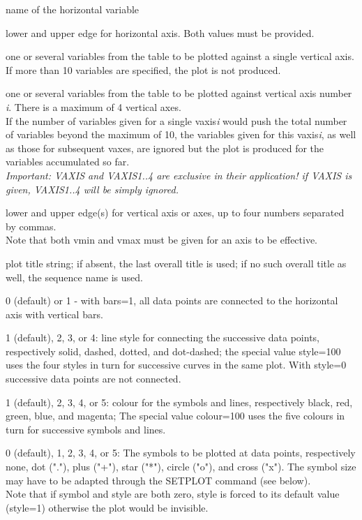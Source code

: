 \begin{madlist}
    name of the horizontal variable 

    lower and upper edge for horizontal axis. Both
   values must be provided. 

    one or several variables from the table to be plotted
     against a single vertical axis. If more than 10 variables are
     specified, the plot is not produced.   

    one or several variables from the table to be plotted
     against vertical axis number {\sl i}. There is a maximum of 4
     vertical axes. \\
     If the number of variables given for a single vaxis{\sl i} would
     push the total number of variables beyond the maximum of 10, the
     variables given for this vaxis{\sl i}, as well as those for
     subsequent vaxes, are ignored but the plot is produced for the
     variables accumulated so far.  \\
     \textit{Important: VAXIS and VAXIS{1..4} are exclusive in their
       application! if VAXIS is given, VAXIS{1..4} will be simply ignored.} 

    lower and upper edge(s) for vertical axis or axes, up to four
     numbers separated by commas.\\
     Note that both vmin and vmax must be given for an axis to be effective.   

    plot title string; if absent, the last overall title is
     used; if no such overall title as well, the sequence name is used.

    0 (default) or 1 - with bars=1, all data points
     are connected to the horizontal axis with vertical bars.   

    1 (default), 2, 3, or 4: line style for connecting the
     successive data points, respectively solid, dashed, dotted, and dot-dashed; 
     the special value style=100 uses the four styles in turn for
     successive curves in the same plot. 
     With style=0 successive data points are not connected. 

    1 (default), 2, 3, 4, or 5: colour for the symbols and lines, 
     respectively black, red, green, blue, and magenta; 
     The special value colour=100  uses the five colours in turn for
     successive symbols and lines.

    0 (default), 1, 2, 3, 4, or 5: The symbols to be
     plotted at data points, respectively none, dot ("."), plus ("+"),
     star ("*"), circle ("o"), and cross ("x").  
     The symbol size may have to be adapted through the SETPLOT command
     (see below). \\ 
     Note that if symbol and style are both zero, style is
     forced to its default value (style=1) otherwise the plot would be
     invisible. 


\end{madlist}
